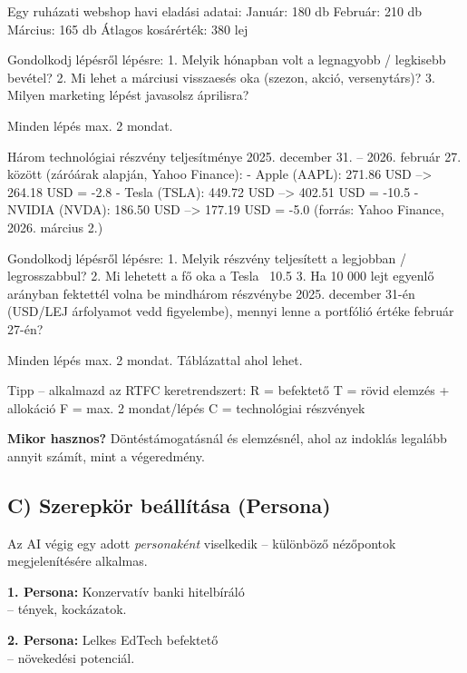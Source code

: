 \documentclass[11pt,a4paper]{article}
\newcommand{\tip}[1]{%
  \vspace{3pt}%
  \begin{tcolorbox}[tipstyle]%
  \textbf{\textcolor{tipborder}{Mikor hasznos?}} #1%
  \end{tcolorbox}\vspace{2pt}}
\newcommand{\lbl}[1]{\vspace{6pt}\noindent{\small\bfseries\textcolor{labelcolor}{#1}}\par\smallskip}
\begin{document}
\begin{prompt}
Egy ruházati webshop havi eladási adatai:
Január: 180 db   Február: 210 db   Március: 165 db
Átlagos kosárérték: 380 lej

Gondolkodj lépésről lépésre:
1. Melyik hónapban volt a legnagyobb / legkisebb bevétel?
2. Mi lehet a márciusi visszaesés oka (szezon, akció, versenytárs)?
3. Milyen marketing lépést javasolsz áprilisra?

Minden lépés max. 2 mondat.
\end{prompt}

\lbl{Alternatív feladat -- részvényelemzés}

\begin{prompt}
Három technológiai részvény teljesítménye 2025. december 31. --
2026. február 27. között (záróárak alapján, Yahoo Finance):
- Apple (AAPL):  271.86 USD --> 264.18 USD = -2.8%
- Tesla (TSLA):  449.72 USD --> 402.51 USD = -10.5%
- NVIDIA (NVDA): 186.50 USD --> 177.19 USD = -5.0%
(forrás: Yahoo Finance, 2026. március 2.)

Gondolkodj lépésről lépésre:
1. Melyik részvény teljesített a legjobban / legrosszabbul?
2. Mi lehetett a fő oka a Tesla ~10.5%
3. Ha 10 000 lejt egyenlő arányban fektettél volna be mindhárom
   részvénybe 2025. december 31-én (USD/LEJ árfolyamot vedd
   figyelembe), mennyi lenne a portfólió értéke február 27-én?

Minden lépés max. 2 mondat. Táblázattal ahol lehet.

Tipp -- alkalmazd az RTFC keretrendszert:
R = befektető
T = rövid elemzés + allokáció
F = max. 2 mondat/lépés
C = technológiai részvények
\end{prompt}

\tip{Döntéstámogatásnál és elemzésnél, ahol az indoklás legalább annyit számít, mint a végeredmény.}

\subsection{C) Szerepkör beállítása (Persona)}

Az AI végig egy adott \textit{personaként} viselkedik – különböző nézőpontok megjelenítésére alkalmas.

\medskip
\noindent\textbf{1. Persona:} Konzervatív banki hitelbíráló\\
-- tények, kockázatok.

\noindent\textbf{2. Persona:} Lelkes EdTech befektető\\
-- növekedési potenciál.
\end{document}
